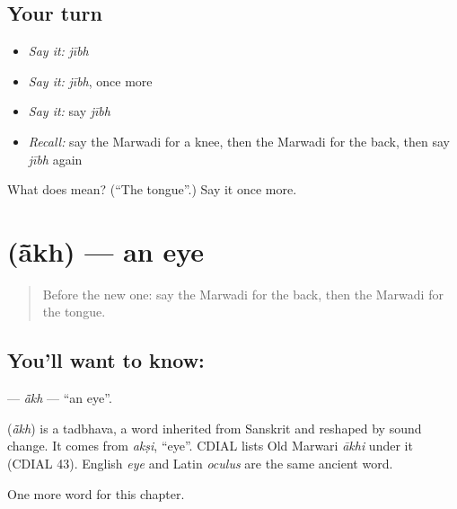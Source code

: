 \subsection*{Your turn}
\begin{itemize}
\raggedright
  \item \emph{Say it:} \emph{jībh}
  \item \emph{Say it:} \emph{jībh}, once more
  \item \emph{Say it:} say \emph{jībh}
  \item \emph{Recall:} say the Marwadi for a knee, then the Marwadi for the back, then say \emph{jībh} again
\end{itemize}

\begin{tcolorbox}[breakable,colback=teal!4,colframe=teal!35!black,title={Before you move on}]
What does  mean? (\textquotedblleft{}The tongue\textquotedblright{}.) Say it once more.
\end{tcolorbox}
\section[\texorpdfstring{\mw{आंख} (ā̃kh)}{आंख (ā̃kh)}]{ (ā̃kh) — an eye}

\label{lesson:MW-C46-akh}



\begin{quote}
Before the new one: say the Marwadi for the back, then the Marwadi for the tongue.
\end{quote}

\subsection*{You'll want to know: }
\textbf{} — \emph{ā̃kh} — \textquotedblleft{}an eye\textquotedblright{}.

\begin{cousinweb}
\textbf{} (\emph{ā̃kh}) is a tadbhava, a word inherited from Sanskrit and reshaped by sound change. It comes from \emph{akṣi}, \textquotedblleft{}eye\textquotedblright{}. CDIAL lists Old Marwari \emph{ākhi} under it (CDIAL 43). English \emph{eye} and Latin \emph{oculus} are the same ancient word.
\end{cousinweb}

\begin{grammarlens}[title={What you've built}]
One more word for this chapter.
\end{grammarlens}

